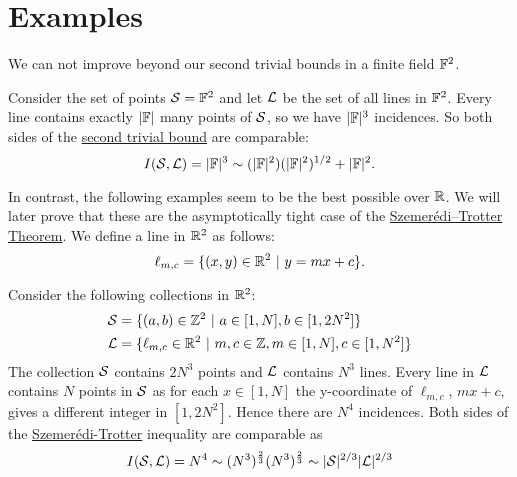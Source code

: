 \section{Examples}
We can not improve beyond our second trivial bounds in a finite field $\mathbb F^2$. 
\begin{example}
Consider the set of points $\mathcal S=\mathbb F^2$ and let $\mathcal L$ be the set of all lines 
in $\mathbb F^2$. Every line contains exactly $|\mathbb F|$ many points of $\mathcal S$, so we have $|\mathbb F|^3$ incidences. 
So both sides of the \hyperref[thm:pretty-trivial-ST-bounds]{second trivial bound} are comparable:
$$
I(\mathcal S,\mathcal L) = |\mathbb F|^3 \sim (|\mathbb F|^2)(|\mathbb F|^2)^{1/2} + |\mathbb F|^2.
$$
\end{example}
In contrast, the following examples seem to be the best possible over $\mathbb R$. We will later prove that these are the asymptotically tight case of the \hyperref[thm:S-T]{Szemerédi–Trotter Theorem}.
We define a line in $\mathbb R^2$ as follows:
\[
    \ell_{m,c} = \{(x,y) \in \mathbb R^2 \ | \ y = mx+c\}.     
\]
\begin{example}
    Consider the following collections in $\mathbb R^2$:
    \begin{align*}
    \mathcal S &= \{ (a,b) \in \mathbb Z^2 \ | \ a\in [1,N], b \in [1,2N^2] \} \\
    \mathcal L &= \{ \ell_{m,c} \in \mathbb R^2 \ | \ m,c\in \mathbb Z, m\in [1,N], c \in [1,N^2] \} \end{align*}
    The collection $\mathcal S$ contains $2N^3$ points and $\mathcal L$ contains $N^3$ lines. Every line in $\mathcal L$ contains $N$ points in $\mathcal S$ as for each $x \in [1,N]$  the y-coordinate of $\ell_{m,c}$, $ mx+c$, gives a different integer in $[1,2N^2]$.
    Hence there are $N^4$ incidences. Both sides of the \hyperref[thm:S-T]{Szemerédi-Trotter} inequality are comparable as 
    $$ I(\mathcal S,\mathcal L) = N^4 \sim (N^3)^{\frac{2}{3}} (N^3)^{\frac{2}{3}} \sim |\mathcal S|^{2/3} |\mathcal L|^{2/3}$$
\end{example}
